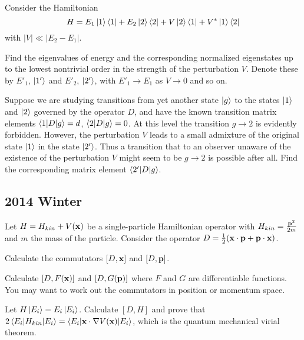 \documentclass[11pt,letterpaper]{article}
\begin{document}
			\item
			\item
		\eenum
		\item
		Consider the Hamiltonian
		\[
			H = E_1\ket 1\bra 1+E_2\ket 2\bra 2+V\ket 2\bra 1 +V^*\ket 1\bra 2
		\]
		with $|V|\ll |E_2-E_1|$.
		\benum
			\item
			Find the eigenvalues of energy and the corresponding normalized eigenstates up to the lowest nontrivial order in the
			strength of the perturbation $V$. Denote these by $E'_1$, $\ket{1'}$ and $E'_2$, $\ket{2'}$, with $E'_1\to E_1$ as $V\to 0$ 
			and so on.
			\item
			Suppose we are studying transitions from yet another state $\ket g$ to the states $\ket 1$ and $\ket 2$ governed by the operator
			$D$, and have the known transition matrix elements $\braket{1|D|g}=d$, $\braket{2|D|g}=0$. At this level the transition $g\to 2$ is 
			evidently forbidden. However, the perturbation $V$ leads to a small admixture of the original state $\ket 1$ in the state $\ket{2'}$. 
			Thus a transition that to an observer unaware of the existence of the perturbation $V$ might seem to be $g\to 2$ is possible after 
			all. Find the corresponding matrix element $\braket{2'|D|g}$. 
		\eenum
	\eenum
	
\phantom{}
\subsection*{2014 Winter}
\phantom{}
	\benum
		\item
		Let $H = H_{kin} + V(\mathbf{x})$ be a single-particle Hamiltonian operator with $H_{kin} = \frac{\mathbf{p}^2}{2m}$ and $m$ the
		mass of the particle. Consider the operator $D = \frac{1}{2}(\mathbf{x}\cdot\mathbf{p} +\mathbf{p}\cdot\mathbf{x})$.
		\benum
			\item
			Calculate the commutators $[D, \mathbf{x}]$ and $[D,\mathbf{p}]$.
			\\
			\item
			Calculate $[D, F(\mathbf{x})]$ and $[D,G(\mathbf{p})]$ where $F$ and $G$ are differentiable functions. You may want to
			work out the commutators in position or momentum space.
			\\
			\item
			Let $H\ket{E_i} = E_i\ket{E_i}$. Calculate $[D,H]$ and prove that $2\braket{E_i|H_{kin}|E_i} = 
			\braket{E_i|\mathbf{x}\cdot\nabla V(\mathbf{x})|E_i}$, which is the quantum mechanical virial theorem. 
		\eenum
	\eenum
\end{document}
